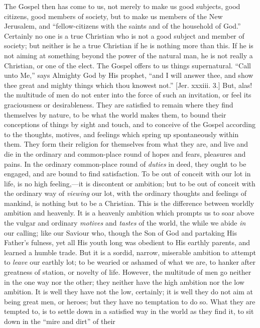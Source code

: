 The Gospel then has come to us, not merely to make us good
subjects, good citizens, good members of society, but to make us
members of the New Jerusalem, and ``fellow-citizens with the
saints and of the household of God.'' Certainly no one is a true
Christian who is not a good subject and member of society; but neither
is he a true Christian if he is nothing more than this. If he is not
aiming at something beyond the power of the natural man, he is not
really a Christian, or one of the elect. The Gospel offers to us
things supernatural. ``Call unto Me,'' says Almighty God by
His prophet, ``and I will answer thee, and show thee great and
mighty things which thou knowest not.'' [Jer. xxxiii. 3.] But,
alas! the multitude of men do not enter into the force of such an
invitation, or feel its graciousness or desirableness. They are
satisfied to remain where they find themselves by nature, to be what
the world makes them, to bound their conceptions of things by sight
and touch, and to conceive of the Gospel according to the thoughts,
motives, and feelings which spring up spontaneously within them. They
form their religion for themselves from what they are, and live and
die in the ordinary and common-place round of hopes and fears,
pleasures and pains. In the ordinary common-place round of \emph{duties}
in deed, they ought to be engaged, and are bound to find satisfaction.
To be out of conceit with our lot in life, is no high feeling,—it is
discontent or ambition; but to be out of conceit with the ordinary way
of \emph{viewing} our lot, with the ordinary thoughts and feelings of
mankind, is nothing but to be a Christian. This is the difference
between worldly ambition and heavenly. It is a heavenly ambition which
prompts us to soar above the vulgar and ordinary \emph{motives} and \emph{tastes}
of the world, the while we abide \emph{in} our calling; like our
Saviour who, though the Son of God and partaking His Father's fulness,
yet all His youth long was obedient to His earthly parents, and
learned a humble trade. But it is a sordid, narrow, miserable ambition
to attempt to \emph{leave} our earthly lot; to be wearied or ashamed
of what we are, to hanker after greatness of station, or novelty of
life. However, the multitude of men go neither in the one way nor the
other; they neither have the high ambition nor the low ambition. It is
well they have not the low, certainly; it is well they do not aim at
being great men, or heroes; but they have no temptation to do so. What
they are tempted to, is to settle down in a satisfied way in the world
as they find it, to sit down in the ``mire and dirt'' of their
